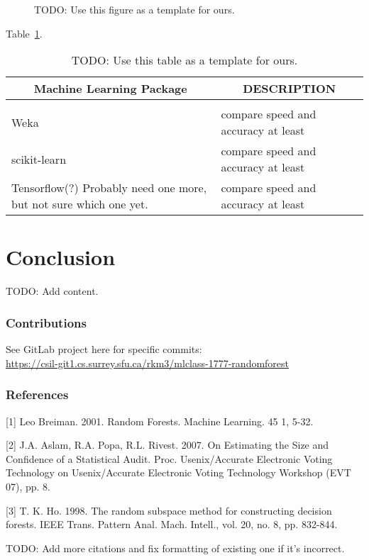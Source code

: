 \documentclass{article} %
\begin{document}
\begin{figure}[h]
\begin{center}
\fbox{\rule[-.5cm]{0cm}{4cm} \rule[-.5cm]{4cm}{0cm}}
\end{center}
\caption{TODO: Use this figure as a template for ours.}
\end{figure}

Table~\ref{sample-table}.

\begin{table}[t]
\caption{TODO: Use this table as a template for ours.}
\label{sample-table}
\begin{center}
\begin{tabular}{ll}
\multicolumn{1}{c}{\bf Machine Learning Package} &\multicolumn{1}{c}{\bf DESCRIPTION}
\\ \hline \\
Weka         &compare speed and accuracy at least \\
scikit-learn             &compare speed and accuracy at least \\
Tensorflow(?) Probably need one more, but not sure which one yet.             &compare speed and accuracy at least \\
\end{tabular}
\end{center}
\end{table}

\section{Conclusion}
TODO: Add content.

\subsubsection*{Contributions}
See GitLab project here for specific commits:\\
\href{
    https://csil-git1.cs.surrey.sfu.ca/rkm3/mlclass-1777-randomforest
}{
    https://csil-git1.cs.surrey.sfu.ca/rkm3/mlclass-1777-randomforest
}

\subsubsection*{References}


\small{
[1] Leo Breiman. 2001. Random Forests. Machine Learning. 45 1, 5-32.

[2]  J.A. Aslam, R.A. Popa, R.L. Rivest. 2007. On Estimating the Size and Confidence of a Statistical Audit. Proc. Usenix/Accurate Electronic Voting Technology on Usenix/Accurate Electronic Voting Technology Workshop (EVT 07), pp. 8.

[3] T. K. Ho. 1998. The random subspace method for constructing decision forests. IEEE Trans. Pattern Anal. Mach. Intell., vol. 20, no. 8, pp. 832-844.

TODO: Add more citations and fix formatting of existing one if it's incorrect.
}
\end{document}
